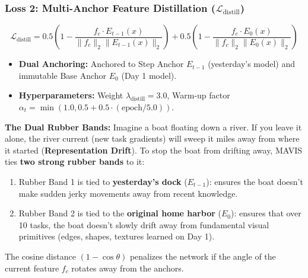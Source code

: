 \documentclass[11pt,a4paper]{article}
\begin{document}
\subsubsection{Loss 2: Multi-Anchor Feature Distillation ($\mathcal{L}_{\text{distill}}$)}
\begin{equation}
\mathcal{L}_{\text{distill}} = 0.5 \left( 1 - \frac{f_c \cdot E_{t-1}(x)}{\|f_c\|_2 \|E_{t-1}(x)\|_2} \right) + 0.5 \left( 1 - \frac{f_c \cdot E_0(x)}{\|f_c\|_2 \|E_0(x)\|_2} \right)
\end{equation}
\begin{itemize}[noitemsep]
    \item \textbf{Dual Anchoring:} Anchored to Step Anchor $E_{t-1}$ (yesterday's model) and immutable Base Anchor $E_0$ (Day 1 model).
    \item \textbf{Hyperparameters:} Weight $\lambda_{\text{distill}} = 3.0$, Warm-up factor $\alpha_t = \min(1.0, 0.5 + 0.5 \cdot (\text{epoch} / 5.0))$.
\end{itemize}

\begin{callout}
\textbf{The Dual Rubber Bands:}\newline
Imagine a boat floating down a river. If you leave it alone, the river current (new task gradients) will sweep it miles away from where it started (\textbf{Representation Drift}).\newline
To stop the boat from drifting away, MAVIS ties \textbf{two strong rubber bands} to it:
\begin{enumerate}[noitemsep]
    \item Rubber Band 1 is tied to \textbf{yesterday's dock} ($E_{t-1}$): ensures the boat doesn't make sudden jerky movements away from recent knowledge.
    \item Rubber Band 2 is tied to the \textbf{original home harbor} ($E_0$): ensures that over 10 tasks, the boat doesn't slowly drift away from fundamental visual primitives (edges, shapes, textures learned on Day 1).
\end{enumerate}
The cosine distance $(1 - \cos\theta)$ penalizes the network if the angle of the current feature $f_c$ rotates away from the anchors.
\end{callout}
\end{document}
